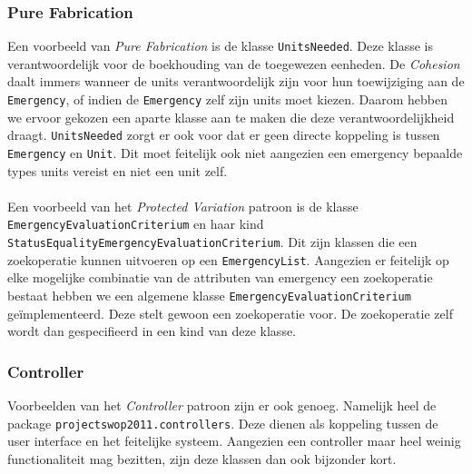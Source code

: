 \subsubsection{Pure Fabrication}
Een voorbeeld van \textit{Pure Fabrication} is de klasse \texttt{UnitsNeeded}. Deze klasse is verantwoordelijk voor de boekhouding van de toegewezen eenheden. De \textit{Cohesion} daalt immers wanneer de units verantwoordelijk zijn voor hun toewijziging aan de \texttt{Emergency}, of indien de \texttt{Emergency} zelf zijn units moet kiezen. Daarom hebben we ervoor gekozen een aparte klasse aan te maken die deze verantwoordelijkheid draagt. \texttt{UnitsNeeded} zorgt er ook voor dat er geen directe koppeling is tussen \texttt{Emergency} en \texttt{Unit}. Dit moet feitelijk ook niet aangezien een emergency bepaalde types units vereist en niet een unit zelf.
\paragraph{} Een voorbeeld van het \textit{Protected Variation} patroon is de klasse \texttt{Emergency\-Evaluation\-Criterium} en haar kind \texttt{Status\-Equality\-Emergency\-Evaluation\-Criterium}. Dit zijn klassen die een zoekoperatie kunnen uitvoeren op een \texttt{EmergencyList}. Aangezien er feitelijk op elke mogelijke combinatie van de attributen van emergency een zoekoperatie bestaat hebben we een algemene klasse \texttt{Emergency\-Evaluation\-Criterium} ge\"implementeerd. Deze stelt gewoon een zoekoperatie voor. De zoekoperatie zelf wordt dan gespecifieerd in een kind van deze klasse.
\subsubsection{Controller}
Voorbeelden van het \textit{Controller} patroon zijn er ook genoeg. Namelijk heel de package \texttt{projectswop\-2011.con\-trollers}. Deze dienen als koppeling tussen de user interface en het feitelijke systeem. Aangezien een controller maar heel weinig functionaliteit mag bezitten, zijn deze klassen dan ook bijzonder kort.
